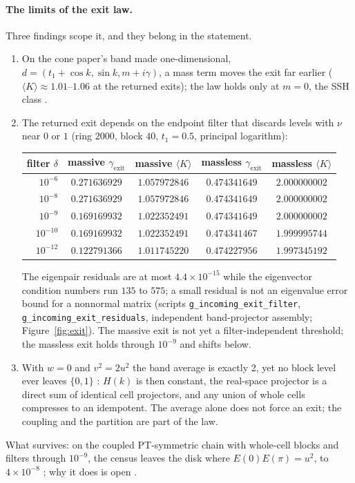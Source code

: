 \paragraph{The limits of the exit law.} Three findings scope it, and they belong in the statement.
\begin{enumerate}
\item On the cone paper's band made one-dimensional, $d=(t_1+\cos k,\sin k,m+i\gamma)$, a mass term moves the exit far earlier ($\langle K\rangle\approx1.01$–$1.06$ at the returned exits); the law holds only at $m=0$, the SSH class .
\item The returned exit depends on the endpoint filter that discards levels with $\nu$ near $0$ or $1$ (ring $2000$, block $40$, $t_1=0.5$, principal logarithm):
\begin{center}\small
\begin{tabular}{rcccc}\toprule
filter $\delta$ & massive $\gamma_{\mathrm{exit}}$ & massive $\langle K\rangle$ & massless $\gamma_{\mathrm{exit}}$ & massless $\langle K\rangle$\\\midrule
$10^{-6}$ & $0.271636929$ & $1.057972846$ & $0.474341649$ & $2.000000002$\\
$10^{-8}$ & $0.271636929$ & $1.057972846$ & $0.474341649$ & $2.000000002$\\
$10^{-9}$ & $0.169169932$ & $1.022352491$ & $0.474341649$ & $2.000000002$\\
$10^{-10}$ & $0.169169932$ & $1.022352491$ & $0.474341467$ & $1.999995744$\\
$10^{-12}$ & $0.122791366$ & $1.011745220$ & $0.474227956$ & $1.997345192$\\\bottomrule
\end{tabular}
\end{center}
The eigenpair residuals are at most $4.4\times10^{-15}$ while the eigenvector condition numbers run $135$ to $575$; a small residual is not an eigenvalue error bound for a nonnormal matrix  (scripts \texttt{g\_incoming\_exit\_filter}, \texttt{g\_incoming\_exit\_residuals}, independent band-projector assembly; Figure~\ref{fig:exit}). The massive exit is not yet a filter-independent threshold; the massless exit holds through $10^{-9}$ and shifts below.
\item With $w=0$ and $v^2=2u^2$ the band average is exactly 2, yet no block level ever leaves $\{0,1\}$ : $H(k)$ is then constant, the real-space projector is a direct sum of identical cell projectors, and any union of whole cells compresses to an idempotent. The average alone does not force an exit; the coupling and the partition are part of the law.
\end{enumerate}
What survives: on the coupled PT-symmetric chain with whole-cell blocks and filters through $10^{-9}$, the census leaves the disk where $E(0)E(\pi)=u^2$, to $4\times10^{-8}$ ; why it does is open .

